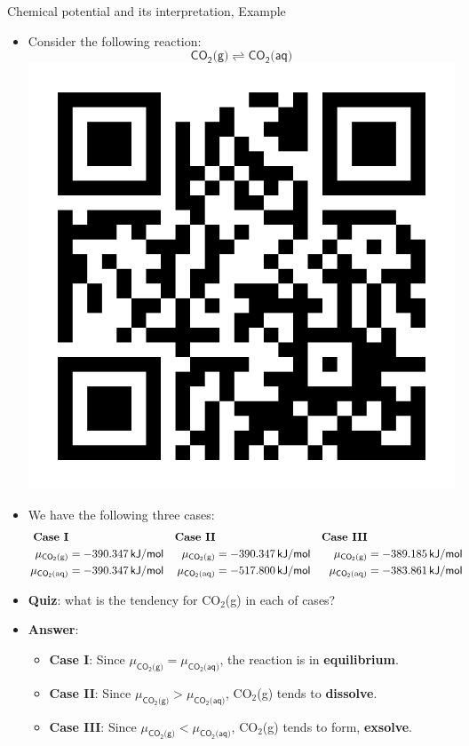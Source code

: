 \begin{frame}{Chemical potential and its interpretation, Example}
\begin{itemize}
\item Consider the following reaction:
\[
\mathsf{CO_{2}\text{(g)}\rightleftharpoons CO_{2}\text{(aq)}}
\]
\vskip -50pt
\includegraphics[height=0.17\columnwidth,right]{figures/chemical-equilibrium/poll.png}
\pause
\vskip -40pt
\item We have the following three cases: 
{
\footnotesize{}
\begin{align*}
\text{\textbf{Case I}} &  & \textbf{Case II} &  & \textbf{Case III}\\
\mu_{\mathsf{CO_{2}\text{(g)}}} & = -390.347\,{\mathsf{kJ/mol}} & 
\mu_{\mathsf{CO_{2}\text{(g)}}} & = -390.347\,{\mathsf{kJ/mol}} & 
\mu_{\mathsf{CO_{2}\text{(g)}}} & = -389.185\,{\mathsf{kJ/mol}}\\
\mu_{\mathsf{CO_{2}\text{(aq)}}} & = -390.347\,{\mathsf{kJ/mol}} & \mu_{\mathsf{CO_{2}\text{(aq)}}} & = -517.800\,{{\mathsf{kJ/mol}}} & \mu_{\mathsf{CO_{2}\text{(aq)}}} & =-383.861\,{\mathsf{kJ/mol}}
\end{align*}
}{\footnotesize\par}
\vskip 10pt 
%
\pause
\item \alert{\textbf{Quiz}}: what is the tendency for CO$_{2}$(g) in each of cases?
%
\hiddenpause
%
\item \alert{\textbf{Answer}}:
\begin{itemize}
\item \textbf{Case I}: Since $\mu_{\mathsf{CO_{2}\text{(g)}}}=\mu_{\mathsf{CO_{2}\text{(aq)}}}$,
the reaction is in \textbf{equilibrium}.
\item \textbf{Case II}: Since $\mu_{\mathsf{CO_{2}\text{(g)}}}>\mu_{\mathsf{CO_{2}\text{(aq)}}}$,
CO$_{2}$(g) tends to \textbf{dissolve}.
\item \textbf{Case III}: Since $\mu_{\mathsf{CO_{2}\text{(g)}}}<\mu_{\mathsf{CO_{2}\text{(aq)}}}$,
CO$_{2}$(g) tends to form, \textbf{exsolve}. 
\end{itemize}
\end{itemize}

\end{frame}
%
